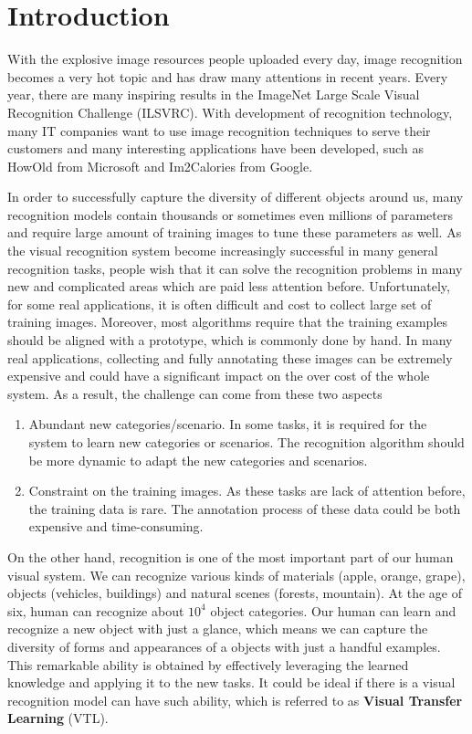 \chapter{Introduction}\label{sec:intro}
With the explosive image resources people uploaded every day, image recognition becomes a very hot topic and has draw many attentions in recent years. Every year, there are many inspiring results in the ImageNet Large Scale Visual Recognition Challenge (ILSVRC). 
With development of recognition technology, many IT companies want to use image recognition techniques to serve their customers and many interesting applications have been developed, such as HowOld from Microsoft and Im2Calories from Google.

In order to successfully capture the diversity of different objects around us, many recognition models contain thousands or sometimes even millions of parameters and require large amount of training images to tune these parameters as well.
As the visual recognition system become increasingly successful in many general recognition tasks, people wish that it can solve the recognition problems in many new and complicated areas which are paid less attention before.
Unfortunately, for some real applications, it is often difficult and cost to collect large set of training images. Moreover, most algorithms require that the training examples should be aligned with a prototype, which is commonly done by hand. In many real applications, collecting and fully annotating these images can be extremely expensive and could have a significant impact on the over cost of the whole system. As a result, the challenge can come from these two aspects
\begin{enumerate}
	\item Abundant new categories/scenario. In some tasks, it is required for the system to learn new categories or scenarios. The recognition algorithm should be more dynamic to adapt the new categories and scenarios.
	\item Constraint on the training images. As these tasks are lack of attention before, the training data is rare. The annotation process of these data could be both expensive and time-consuming. 
\end{enumerate} 

On the other hand, recognition is one of the most important part of our human visual system. We can recognize various kinds of materials (apple, orange, grape), objects (vehicles, buildings) and natural scenes (forests, mountain). At the age of six, human can recognize about $10^4$ object categories\cite{biederman1987recognition}. 
Our human can learn and recognize a new object with just a glance, which means we can capture the diversity of forms and appearances of a objects with just a handful examples. This remarkable ability is obtained by effectively leveraging the learned knowledge and applying it to the new tasks. It could be ideal if there is a visual recognition model can have such ability, which is referred to as \textbf{Visual Transfer Learning} (VTL). 

